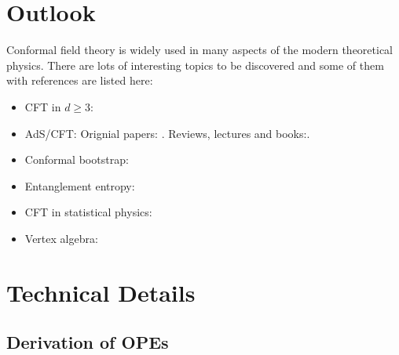 \documentclass[10pt]{article}
\begin{document}
\section*{Outlook}
Conformal field theory is widely used in many aspects of the modern theoretical physics.
There are lots of interesting topics to be discovered and some of them with references are listed here:
\begin{itemize}
    \item CFT in $d\geq3$: \cite{Rychkov:2016iqz}
    \item AdS/CFT: Orignial papers: \cite{Maldacena:1997re,Witten:1998qj}. Reviews, lectures and books:\cite{Ammon:2015wua,Aharony:1999ti,Erdmenger2012,Petersen:1999zh,Penedones:2016voo,Maldacena:2003nj,Nastase:2007kj,becker_becker_schwarz_2006,Kiritsis:2019npv,McMahon:2009zza,Natsuume:2014sfa,DeHaro:2015aht,Kraus2008}.
    \item Conformal bootstrap: \cite{Simmons-Duffin:2016gjk}
    \item Entanglement entropy: \cite{Calabrese:2009qy,Calabrese:2004eu,Rangamani:2016dms}
    \item CFT in statistical physics:
    \item Vertex algebra:
\end{itemize}
\clearpage
\appendix
\section{Technical Details}
\subsection{Derivation of OPEs}
\end{document}
